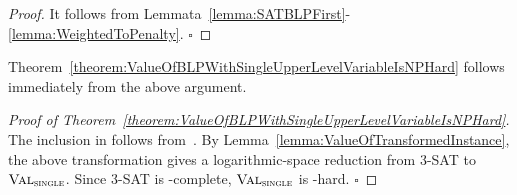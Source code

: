 \documentclass[runningheads,orivec]{llncs}
\newcommand{\MacroColor}[1]{#1}
\newcommand{\MyQED}{\mbox{}\hfill$\square$}
\newcommand{\ComplexityClassStyle}[1]{#1}
\newcommand{\ClassNP}{\MacroColor{\text{\ComplexityClassStyle{NP}}}}
\newcommand{\ThreeSAT}{\MacroColor{\textsc{3-SAT}}}
\newcommand{\ValueOfBLPWithSingleUpperLevelVariableName}{\MacroColor{$\textsc{Val}_{\textsc{single}}$}}
\newcommand{\ValueOfBLPWithSingleUpperLevelVariable}{\hyperref[ValueOfBLPWithSingleUpperLevelVariableAnchor]{\ValueOfBLPWithSingleUpperLevelVariableName{}}}
\begin{document}
\begin{proof}
It follows from Lemmata~\ref{lemma:SATBLPFirst}-\ref{lemma:WeightedToPenalty}.
\MyQED
\end{proof}

Theorem~\ref{theorem:ValueOfBLPWithSingleUpperLevelVariableIsNPHard} follows immediately from the above argument.

\begin{proof}[Proof of Theorem~\ref{theorem:ValueOfBLPWithSingleUpperLevelVariableIsNPHard}]
\label{Rev:LogSpaceReduction}
The inclusion in \ClassNP{} follows from~\cite{Buchheim2023}.
By Lemma~\ref{lemma:ValueOfTransformedInstance}, the above transformation gives a logarithmic-space reduction \cite{papadimitriou1993computational} from \ThreeSAT{} to \ValueOfBLPWithSingleUpperLevelVariable{}.
Since \ThreeSAT{} is \ClassNP{}-complete, \ValueOfBLPWithSingleUpperLevelVariable{} is \ClassNP{}-hard.
\MyQED
\end{proof}
\end{document}
